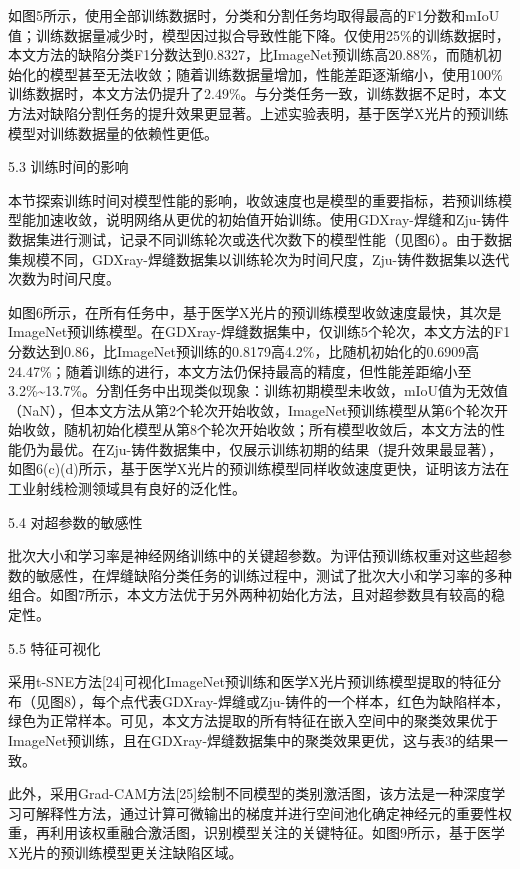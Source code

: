 如图5所示，使用全部训练数据时，分类和分割任务均取得最高的F1分数和mIoU值；训练数据量减少时，模型因过拟合导致性能下降。仅使用25\%的训练数据时，本文方法的缺陷分类F1分数达到0.8327，比ImageNet预训练高20.88\%，而随机初始化的模型甚至无法收敛；随着训练数据量增加，性能差距逐渐缩小，使用100\%训练数据时，本文方法仍提升了2.49\%。与分类任务一致，训练数据不足时，本文方法对缺陷分割任务的提升效果更显著。上述实验表明，基于医学X光片的预训练模型对训练数据量的依赖性更低。

5.3	训练时间的影响

本节探索训练时间对模型性能的影响，收敛速度也是模型的重要指标，若预训练模型能加速收敛，说明网络从更优的初始值开始训练。使用GDXray-焊缝和Zju-铸件数据集进行测试，记录不同训练轮次或迭代次数下的模型性能（见图6）。由于数据集规模不同，GDXray-焊缝数据集以训练轮次为时间尺度，Zju-铸件数据集以迭代次数为时间尺度。

如图6所示，在所有任务中，基于医学X光片的预训练模型收敛速度最快，其次是ImageNet预训练模型。在GDXray-焊缝数据集中，仅训练5个轮次，本文方法的F1分数达到0.86，比ImageNet预训练的0.8179高4.2\%，比随机初始化的0.6909高24.47\%；随着训练的进行，本文方法仍保持最高的精度，但性能差距缩小至3.2\%\textasciitilde13.7\%。分割任务中出现类似现象：训练初期模型未收敛，mIoU值为无效值（NaN），但本文方法从第2个轮次开始收敛，ImageNet预训练模型从第6个轮次开始收敛，随机初始化模型从第8个轮次开始收敛；所有模型收敛后，本文方法的性能仍为最优。在Zju-铸件数据集中，仅展示训练初期的结果（提升效果最显著），如图6(c)(d)所示，基于医学X光片的预训练模型同样收敛速度更快，证明该方法在工业射线检测领域具有良好的泛化性。

5.4	对超参数的敏感性

批次大小和学习率是神经网络训练中的关键超参数。为评估预训练权重对这些超参数的敏感性，在焊缝缺陷分类任务的训练过程中，测试了批次大小和学习率的多种组合。如图7所示，本文方法优于另外两种初始化方法，且对超参数具有较高的稳定性。

5.5 特征可视化

采用t-SNE方法{[}24{]}可视化ImageNet预训练和医学X光片预训练模型提取的特征分布（见图8），每个点代表GDXray-焊缝或Zju-铸件的一个样本，红色为缺陷样本，绿色为正常样本。可见，本文方法提取的所有特征在嵌入空间中的聚类效果优于ImageNet预训练，且在GDXray-焊缝数据集中的聚类效果更优，这与表3的结果一致。

此外，采用Grad-CAM方法{[}25{]}绘制不同模型的类别激活图，该方法是一种深度学习可解释性方法，通过计算可微输出的梯度并进行空间池化确定神经元的重要性权重，再利用该权重融合激活图，识别模型关注的关键特征。如图9所示，基于医学X光片的预训练模型更关注缺陷区域。

